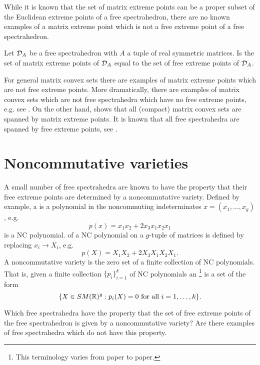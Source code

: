 While it is known that the set of matrix extreme points can be a proper subset of the Euclidean extreme points of a free spectrahedron, there 
are no known examples of a matrix extreme point which is not a free extreme point of a free spectrahedron.

\begin{question}
\label{question:MissingMatExtreme}
Let $\mathcal{D}_A$ be a free spectrahedron with $A$ a tuple of real symmetric matrices. Is the set of matrix extreme points of $\mathcal{D}_A$ equal to the 
set of free extreme points of $\mathcal{D}_A$. 
\end{question}

For general matrix convex sets there are examples of matrix extreme points which are not free extreme points. More dramatically, there are 
examples of matrix convex sets which are not free spectrahedra which have no free extreme points, e.g. see \cite{E18}. On the other hand, 
\cite{WW99} shows that all (compact) matrix convex sets are spanned by matrix extreme points. It is known that all free spectrahedra are 
spanned by free extreme points, see \cite[Theorem 1.1]{EH19}.

\section{Noncommutative varieties}

A small number of free spectrahedra are known to have the property that their free extreme points are determined by a noncommutative variety. 
Defined by example, a  is a polynomial in the noncommuting indeterminates $x=(x_1,\dots,x_g)$, e.g. 
\[
p(x) = x_1 x_2 + 2 x_3 x_1 x_2 x_1
\]
is a NC polynomial.  of a NC polynomial on a $g$-tuple of matrices is defined by replacing $x_i \to X_i$, e.g. 
\[
p(X) = X_1 X_2 + 2 X_3 X_1 X_2 X_1. 
\]
A noncommutative variety is the zero set of a finite collection of NC polynomials. That is, given a finite collection $\{p_i\}_{i=1}^k$ of NC 
polynomials an \footnote{This terminology varies from paper to paper.} is a set of the form 
\[
\{ X \in SM (\R)^g : p_i(X) = 0 \ \mathrm{for \ all \ } i=1,\dots,k\}.
\]

\begin{question}
Which free spectrahedra have the property that the set of free extreme points of the free spectrahedron is given by a noncommutative variety? 
Are there examples of free spectrahedra which do not have this property.
\end{question}

